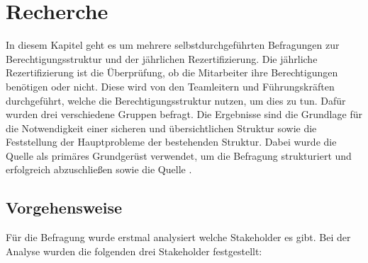 \chapter{Recherche}
\label{ch:Recherche}
In diesem Kapitel geht es um mehrere selbstdurchgeführten Befragungen zur Berechtigungsstruktur und der jährlichen Rezertifizierung.
Die jährliche Rezertifizierung ist die Überprüfung, ob die Mitarbeiter ihre Berechtigungen benötigen oder nicht.
Diese wird von den Teamleitern und Führungskräften durchgeführt, welche die Berechtigungsstruktur nutzen, um dies zu tun.
Dafür wurden drei verschiedene Gruppen befragt.
Die Ergebnisse sind die Grundlage für die Notwendigkeit einer sicheren und übersichtlichen Struktur sowie die Feststellung der Hauptprobleme der bestehenden Struktur.
Dabei wurde die Quelle \cite{HowSurvey} als primäres Grundgerüst verwendet, um die Befragung strukturiert und erfolgreich abzuschließen sowie die Quelle \cite{Survey}.

\section{Vorgehensweise}
\label{sec:Vorgehensweise}
Für die Befragung wurde erstmal analysiert welche Stakeholder es gibt.
Bei der Analyse wurden die folgenden drei Stakeholder festgestellt:

